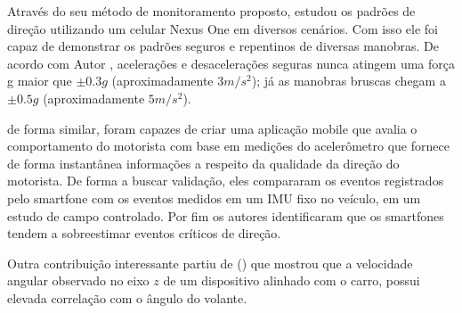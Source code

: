 \citeauthor{fazeen2012safe} Através do seu método de monitoramento proposto, estudou os padrões de direção utilizando um celular Nexus One em diversos cenários. Com isso ele foi capaz de demonstrar os padrões seguros e repentinos de diversas manobras. De acordo com Autor \citep{fazeen2012safe}, acelerações e desacelerações seguras nunca atingem uma força g maior que $\pm 0.3g $ (aproximadamente $3m/s^2$); já as manobras bruscas chegam a $\pm 0.5g$ (aproximadamente $5m/s^2$).

\citeauthor*{Paefgen:2012:DBA:2406367.2406412} de forma similar, foram capazes de criar uma aplicação mobile que avalia o comportamento do motorista com base em medições do acelerômetro que fornece de forma instantânea informações a respeito da qualidade da direção do motorista. De forma a buscar validação, eles compararam os eventos registrados pelo smartfone com os eventos medidos em um IMU fixo no veículo, em um estudo de campo controlado. Por fim os autores identificaram que os smartfones tendem a sobreestimar eventos críticos de direção.

Outra contribuição interessante partiu de \citeauthor{zheng2015mobileutdrive} (\citeyear{zheng2015mobileutdrive}) que mostrou que a velocidade angular observado no eixo $z$ de um dispositivo alinhado com o carro, possui elevada correlação com o ângulo do volante. 

